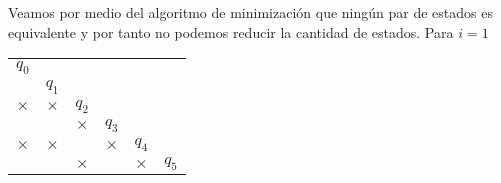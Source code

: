     Veamos por medio del algoritmo de minimización que ningún par de estados es equivalente y por tanto no podemos reducir la cantidad de estados.
    Para $i=1$
    \begin{center}
            \begin{tabular}{cccccc}
                $q_0$ \\ \cline{1-1}
                \multicolumn{1}{|c|}{} & $q_1$ \\ \cline{1-2}
                \multicolumn{1}{|c|}{$\times$} & \multicolumn{1}{|c|}{$\times$} & $q_2$ \\ \cline{1-3}
                \multicolumn{1}{|c|}{} & \multicolumn{1}{|c|}{}  & \multicolumn{1}{|c|}{$\times$} & $q_3$ \\ \cline{1-4} 
                \multicolumn{1}{|c|}{$\times$} & \multicolumn{1}{|c|}{$\times$} & \multicolumn{1}{|c|}{} & \multicolumn{1}{|c|}{$\times$} & $q_4$ \\ \cline{1-5}
                \multicolumn{1}{|c|}{} & \multicolumn{1}{|c|}{} & \multicolumn{1}{|c|}{$\times$} & \multicolumn{1}{|c|}{}  & \multicolumn{1}{|c|}{$\times$} & $q_5$ \\ \cline{1-5}         
            \end{tabular}
        \end{center}

